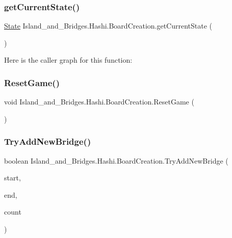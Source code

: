 \subsubsection{\texorpdfstring{get\+Current\+State()}{getCurrentState()}}
{\footnotesize\ttfamily \mbox{\hyperlink{class_island__and___bridges_1_1_hashi_1_1_board_creation_1_1_state}{State}} Island\+\_\+and\+\_\+\+Bridges.\+Hashi.\+Board\+Creation.\+get\+Current\+State (\begin{DoxyParamCaption}{ }\end{DoxyParamCaption})}

Here is the caller graph for this function\+:
\mbox{\label{class_island__and___bridges_1_1_hashi_1_1_board_creation_a4517f61489e5511d4201653176ed66ac}} 
\subsubsection{\texorpdfstring{Reset\+Game()}{ResetGame()}}
{\footnotesize\ttfamily void Island\+\_\+and\+\_\+\+Bridges.\+Hashi.\+Board\+Creation.\+Reset\+Game (\begin{DoxyParamCaption}{ }\end{DoxyParamCaption})}

\mbox{\label{class_island__and___bridges_1_1_hashi_1_1_board_creation_ab8c1a9fe93d59d2aaa70519a17a3870a}} 
\subsubsection{\texorpdfstring{Try\+Add\+New\+Bridge()}{TryAddNewBridge()}}
{\footnotesize\ttfamily boolean Island\+\_\+and\+\_\+\+Bridges.\+Hashi.\+Board\+Creation.\+Try\+Add\+New\+Bridge (\begin{DoxyParamCaption}\item[{\mbox{\hyperlink{class_island__and___bridges_1_1_hashi_1_1_board_element}{Board\+Element}}}]{start,  }\item[{\mbox{\hyperlink{class_island__and___bridges_1_1_hashi_1_1_board_element}{Board\+Element}}}]{end,  }\item[{int}]{count }\end{DoxyParamCaption})}

